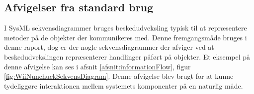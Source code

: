 \subsection{Afvigelser fra standard brug}
I SysML sekvensdiagrammer bruges beskedudveksling typisk til at repræsentere metoder på de objekter der kommunikeres med. Denne fremgangsmåde bruges i denne raport, dog er der nogle sekvensdiagrammer der afviger ved at beskedudvekslingen repræsenterer handlinger påført på objekter. Et eksempel på denne afvigelse kan ses i afsnit \ref{afsnit:informationFlow}, figur \ref{fig:WiiNunchuckSekvensDiagram}. Denne afvigelse blev brugt for at kunne tydeliggøre interaktionen mellem systemets komponenter på en naturlig måde.